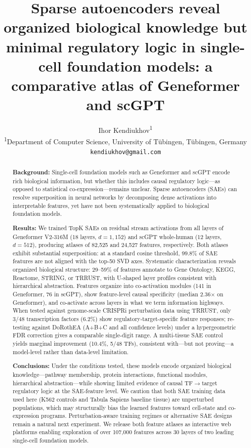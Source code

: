 \documentclass[onecolumn]{article}
\title{\textbf{Sparse autoencoders reveal organized biological knowledge but minimal regulatory logic in single-cell foundation models: a comparative atlas of Geneformer and scGPT}}
\author{Ihor Kendiukhov\textsuperscript{1}\\[6pt]
\textsuperscript{1}Department of Computer Science, University of T\"ubingen, T\"ubingen, Germany\\
\texttt{kendiukhov@gmail.com}}
\date{}
\begin{document}
\maketitle

\begin{abstract}

\textbf{Background:}
Single-cell foundation models such as Geneformer and scGPT encode rich biological information, but whether this includes causal regulatory logic---as opposed to statistical co-expression---remains unclear. Sparse autoencoders (SAEs) can resolve superposition in neural networks by decomposing dense activations into interpretable features, yet have not been systematically applied to biological foundation models.

\textbf{Results:}
We trained TopK SAEs on residual stream activations from all layers of Geneformer V2-316M (18 layers, $d{=}1{,}152$) and scGPT whole-human (12 layers, $d{=}512$), producing atlases of 82,525 and 24,527 features, respectively. Both atlases exhibit substantial superposition: at a standard cosine threshold, 99.8\% of SAE features are not aligned with the top-50 SVD axes. Systematic characterization reveals organized biological structure: 29--59\% of features annotate to Gene Ontology, KEGG, Reactome, STRING, or TRRUST, with U-shaped layer profiles consistent with hierarchical abstraction. Features organize into co-activation modules (141 in Geneformer, 76 in scGPT), show feature-level causal specificity (median 2.36$\times$ on Geneformer), and co-activate across layers in what we term information highways. When tested against genome-scale CRISPRi perturbation data using TRRUST, only 3/48 transcription factors (6.2\%) show regulatory-target-specific feature responses; re-testing against DoRothEA (A+B+C and all confidence levels) under a hypergeometric FDR correction gives a comparable single-digit range. A multi-tissue SAE control yields marginal improvement (10.4\%, 5/48 TFs), consistent with---but not proving---a model-level rather than data-level limitation.

\textbf{Conclusions:}
Under the conditions tested, these models encode organized biological knowledge---pathway membership, protein interactions, functional modules, hierarchical abstraction---while showing limited evidence of causal TF$\to$target regulatory logic at the SAE-feature level. We caution that both SAE training data used here (K562 controls and Tabula Sapiens baseline tissue) are unperturbed populations, which may structurally bias the learned features toward cell-state and co-expression programs. Perturbation-aware training regimes or alternative SAE designs remain a natural next experiment. We release both feature atlases as interactive web platforms enabling exploration of over 107,000 features across 30 layers of two leading single-cell foundation models.
\end{abstract}
\end{document}
